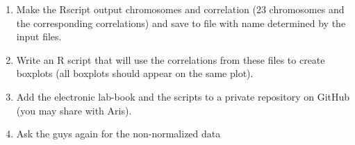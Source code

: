 \documentclass[idxtotoc,hyperref,openany]{labbook} %
\newcommand{\HRule}{\rule{\linewidth}{0.5mm}} %
\begin{document}
\begin{enumerate}
  \item Make the Rscript output chromosomes and correlation
  (23 chromosomes and the corresponding correlations) and save
  to file with name determined by the input files.
  \item Write an R script that will use the correlations
  from these files to create boxplots (all boxplots should
  appear on the same plot).
  \item Add the electronic lab-book and the scripts to a private
  repository on GitHub (you may share with Aris).
  \item Ask the guys again for the non-normalized data
\end{enumerate}
    








\end{document}
